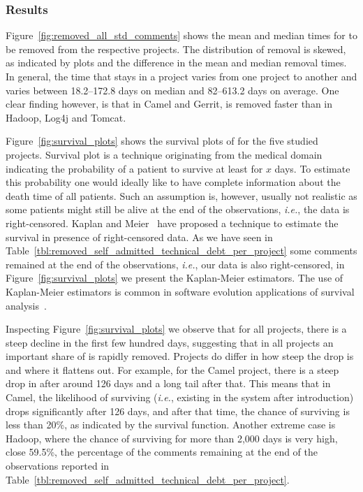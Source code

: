
\subsubsection*{Results} Figure~\ref{fig:removed_all_std_comments} shows the mean and median times for \SATD to be removed from the respective projects. The distribution of \SATD removal is skewed, as indicated by plots and the difference in the mean and median removal times. In general, the time that \SATD stays in a project  varies from one project to another and varies between 18.2--172.8 days on median and 82--613.2 days on average. One clear finding however, is that in Camel and Gerrit, \SATD is removed faster than in Hadoop, Log4j and Tomcat.

Figure~\ref{fig:survival_plots} shows the survival plots of \SATD for the five studied projects. 
Survival plot is a technique originating from the medical domain indicating the probability of 
a patient to survive at least for $x$ days. To estimate this probability one would ideally like to 
have complete information about the death time of all patients. Such an assumption is, however,
usually not realistic as some patients might still be alive at the end of the observations, \emph{i.e.},
the data is right-censored. Kaplan
and Meier~\cite{kaplan1958nonparametric} have proposed a technique to estimate the survival
in presence of right-censored data. As we have seen in Table~\ref{tbl:removed_self_admitted_technical_debt_per_project} some \SATD comments remained at
the end of the observations, \emph{i.e.}, our data is also right-censored, in Figure~\ref{fig:survival_plots}
we present the Kaplan-Meier estimators. The use of Kaplan-Meier estimators is common in 
software evolution applications of survival analysis~\cite{samoladas2010survival,goeminne2015towards}.

Inspecting Figure~\ref{fig:survival_plots} we observe that for all projects, there is a steep decline in the first few hundred days, suggesting that in all projects an important share of \SATD is rapidly removed. Projects do differ in how steep the drop is and where it flattens out. For example, for the Camel project, there is a steep drop in \SATD after around 126 days and a long tail after that. This means that in Camel, the likelihood of \SATD surviving (\emph{i.e.}, existing in the system after introduction) drops significantly after 126 days, and after that time, the chance of surviving is less than 20\%, as indicated by the survival function. Another extreme case is Hadoop, where the chance of \SATD surviving for more than 2,000 days is very high, close 59.5\%, the percentage
of the \SATD comments remaining at the end of the observations reported in Table~\ref{tbl:removed_self_admitted_technical_debt_per_project}. 

